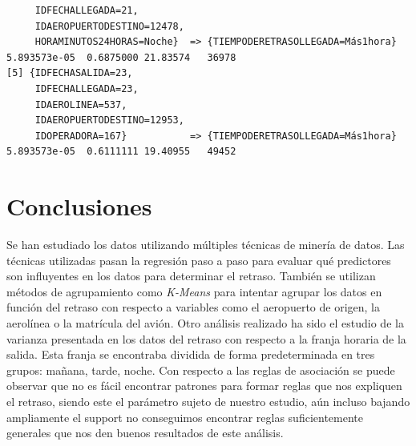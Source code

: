 \documentclass{article}
\begin{document}
\begin{lstlisting}
     IDFECHALLEGADA=21,                                                                                      
     IDAEROPUERTODESTINO=12478,                                                                              
     HORAMINUTOS24HORAS=Noche}  => {TIEMPODERETRASOLLEGADA=Más1hora} 5.893573e-05  0.6875000 21.83574   36978
[5] {IDFECHASALIDA=23,                                                                                       
     IDFECHALLEGADA=23,                                                                                      
     IDAEROLINEA=537,                                                                                        
     IDAEROPUERTODESTINO=12953,                                                                              
     IDOPERADORA=167}           => {TIEMPODERETRASOLLEGADA=Más1hora} 5.893573e-05  0.6111111 19.40955   49452
\end{lstlisting}


\newpage
\section{Conclusiones}

Se han estudiado los datos utilizando múltiples técnicas de minería de datos. Las técnicas utilizadas pasan la regresión paso a paso para evaluar qué predictores son influyentes en los datos para determinar el retraso. También se utilizan métodos de agrupamiento como \textit{K-Means} para intentar agrupar los datos en función del retraso con respecto a variables como el aeropuerto de origen, la aerolínea o la matrícula del avión. Otro análisis realizado ha sido el estudio de la varianza presentada en los datos del retraso con respecto a la franja horaria de la salida. Esta franja se encontraba dividida de forma predeterminada en tres grupos: mañana, tarde, noche.
Con respecto a las reglas de asociación se puede observar que no es fácil encontrar patrones para formar reglas que nos expliquen el retraso, siendo este el parámetro sujeto de nuestro estudio, aún incluso bajando ampliamente el support no conseguimos encontrar reglas suficientemente generales que nos den buenos resultados de este análisis.\\
\end{document}
